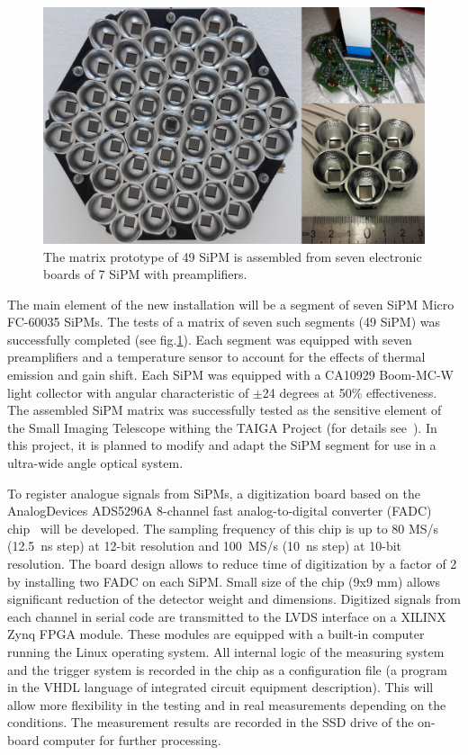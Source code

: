 \documentclass[a4paper,11pt]{article}
\begin{document}
\begin{figure}[t]
\centering %
\includegraphics[width=.55\textwidth]{mosaic_protype.png}
\caption{The matrix prototype of 49 SiPM is assembled from seven electronic boards of 7 SiPM with preamplifiers.}
\label{fig:mosaic49_7}
\end{figure}

The main element of the new installation will be a segment of seven SiPM Micro FC-60035 SiPMs. The tests of a matrix of seven such segments (49 SiPM) was successfully completed (see fig.\ref{fig:mosaic49_7}). Each segment was equipped with seven preamplifiers and a temperature sensor to account for the effects of thermal emission and gain shift. Each SiPM was equipped with a CA10929 Boom-MC-W light collector with angular characteristic of $\pm$24 degrees at 50\% effectiveness. The assembled SiPM matrix was successfully tested as the sensitive element of the Small Imaging Telescope withing the TAIGA Project (for details see~\cite{SIT20}). In this project, it is planned to modify and adapt the SiPM segment for use in a ultra-wide angle optical system.

To register analogue signals from SiPMs, a digitization board based on the AnalogDevices ADS5296A 8-channel fast analog-to-digital converter (FADC) chip~\cite{FADC} will be developed. The sampling frequency of this chip is up to 80 MS/s (12.5~ns step) at 12-bit resolution and 100~MS/s (10~ns step) at 10-bit resolution.
The board design allows to reduce time of digitization by a factor of 2 by installing two FADC on each SiPM.
Small size of the chip (9x9 mm) allows significant reduction of the detector weight and dimensions. 
Digitized signals from each channel in serial code are transmitted to the LVDS interface on a XILINX Zynq FPGA module.
These modules are equipped with a built-in computer running the Linux operating system.
All internal logic of the measuring system and the trigger system is recorded in the chip as a configuration file (a program in the VHDL language of integrated circuit equipment description). This will allow more flexibility in the testing and in real measurements depending on the conditions.
The measurement results are recorded in the SSD drive of the on-board computer for further processing.
\end{document}
